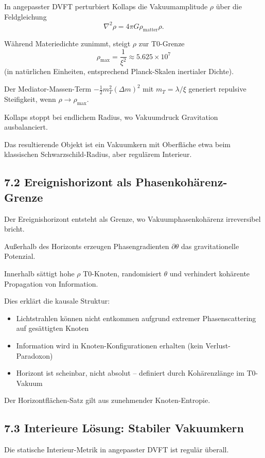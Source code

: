 	In angepasster DVFT perturbiert Kollaps die Vakuumamplitude $\rho$ über die Feldgleichung
	\[
	\nabla^2 \rho = 4\pi G \rho_{\text{matter}} \rho.
	\]
	
	Während Materiedichte zunimmt, steigt $\rho$ zur T0-Grenze
	\[
	\rho_{\text{max}} = \frac{1}{\xi^2} \approx 5.625 \times 10^7
	\]
	(in natürlichen Einheiten, entsprechend Planck-Skalen inertialer Dichte).
	
	Der Mediator-Massen-Term $-\frac{1}{2} m_T^2 (\Delta m)^2$ mit $m_T = \lambda / \xi$ generiert repulsive Steifigkeit, wenn $\rho \to \rho_{\text{max}}$.
	
	Kollaps stoppt bei endlichem Radius, wo Vakuumdruck Gravitation ausbalanciert.
	
	Das resultierende Objekt ist ein Vakuumkern mit Oberfläche etwa beim klassischen Schwarzschild-Radius, aber regulärem Interieur.
	
	\subsection{7.2 Ereignishorizont als Phasenkohärenz-Grenze}
	
	Der Ereignishorizont entsteht als Grenze, wo Vakuumphasenkohärenz irreversibel bricht.
	
	Außerhalb des Horizonts erzeugen Phasengradienten $\partial \theta$ das gravitationelle Potenzial.
	
	Innerhalb sättigt hohe $\rho$ T0-Knoten, randomisiert $\theta$ und verhindert kohärente Propagation von Information.
	
	Dies erklärt die kausale Struktur:
	\begin{itemize}
		\item Lichtstrahlen können nicht entkommen aufgrund extremer Phasenscattering auf gesättigten Knoten
		\item Information wird in Knoten-Konfigurationen erhalten (kein Verlust-Paradoxon)
		\item Horizont ist scheinbar, nicht absolut – definiert durch Kohärenzlänge im T0-Vakuum
	\end{itemize}
	
	Der Horizontflächen-Satz gilt aus zunehmender Knoten-Entropie.
	
	\subsection{7.3 Interieure Lösung: Stabiler Vakuumkern}
	
	Die statische Interieur-Metrik in angepasster DVFT ist regulär überall.
	
